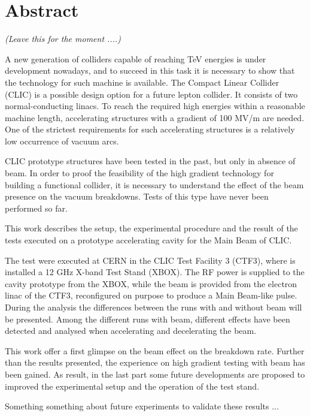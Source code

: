 \chapter*{Abstract}

\begin{center}
\textit{(Leave this for the moment ....)}
\vspace{1cm}
\end{center}



A new generation of colliders capable of reaching TeV energies is under development nowadays, and to succeed in this task it is necessary to show that the technology for such machine is available. The Compact Linear Collider (CLIC) is a possible design option for a future lepton collider. It consists of two normal-conducting linacs. To reach the required high energies within a reasonable machine length, accelerating structures with a gradient of 100 MV/m are needed. One of the strictest requirements for such accelerating structures is a relatively low occurrence of vacuum arcs. 

CLIC prototype structures have been tested in the past, but only in absence of beam. In order to proof the feasibility of the high gradient technology for building a functional collider, it is necessary to understand the effect of the beam presence on the vacuum breakdowns. Tests of this type have never been performed so far. 

This work describes the setup, the experimental procedure and the result of the tests executed on a prototype accelerating cavity for the Main Beam of CLIC. 

The test were executed at CERN in the CLIC Test Facility 3 (CTF3), where is installed a 12 GHz X-band Test Stand (XBOX). The RF power is supplied to the cavity prototype from the XBOX, while the beam is provided from the electron linac of the CTF3, reconfigured on purpose to produce a Main Beam-like pulse. 
During the analysis the differences between the runs with and without beam will be presented. Among the different runs with beam, different effects have been detected and analysed when accelerating and decelerating the beam. 

This work offer a first glimpse on the beam effect on the breakdown rate. Further than the results presented, the experience on high gradient testing with beam has been gained. As result, in the last part some future developments are proposed to improved the experimental setup and the operation of the test stand. 


Something something about future experiments to validate these results ...
